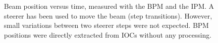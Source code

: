 \begin{figure}[!ht]
	\begin{center}
		
	\end{center}
  \caption[Beam position versus time, measured with the BPM and the IPM]
  {Beam position versus time, measured with the BPM and the IPM.
  A steerer has been used to move the beam (step transitions).
  However, small variations between two steerer steps were not expected. 
  BPM positions were directly extracted from IOCs without any processing.}
	\label{chap4:BPMvsIPM}
\end{figure}
